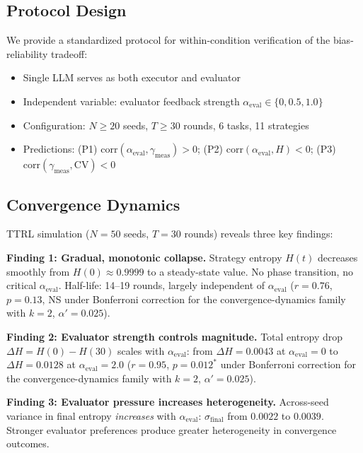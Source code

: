 \documentclass[11pt]{article}
\begin{document}
\subsection{Protocol Design}

We provide a standardized protocol for within-condition verification of the bias-reliability tradeoff:

\begin{itemize}[leftmargin=*,nosep]
 \item Single LLM serves as both executor and evaluator
 \item Independent variable: evaluator feedback strength $\alpha_{\text{eval}} \in \{0, 0.5, 1.0\}$
 \item Configuration: $N \geq 20$ seeds, $T \geq 30$ rounds, 6 tasks, 11 strategies
 \item Predictions: (P1) $\text{corr}(\alpha_{\text{eval}}, \gamma_{\text{meas}}) > 0$; (P2) $\text{corr}(\alpha_{\text{eval}}, H) < 0$; (P3) $\text{corr}(\gamma_{\text{meas}}, \mathrm{CV}) < 0$
\end{itemize}

\subsection{Convergence Dynamics}

TTRL simulation ($N{=}50$ seeds, $T{=}30$ rounds) reveals three key findings:

\textbf{Finding 1: Gradual, monotonic collapse.} Strategy entropy $H(t)$ decreases smoothly from $H(0) \approx 0.9999$ to a steady-state value. No phase transition, no critical $\alpha_{\text{eval}}$. Half-life: 14--19 rounds, largely independent of $\alpha_{\text{eval}}$ ($r = 0.76$, $p = 0.13$, NS under Bonferroni correction for the convergence-dynamics family with $k = 2$, $\alpha' = 0.025$).

\textbf{Finding 2: Evaluator strength controls magnitude.} Total entropy drop $\Delta H = H(0) - H(30)$ scales with $\alpha_{\text{eval}}$: from $\Delta H = 0.0043$ at $\alpha_{\text{eval}} = 0$ to $\Delta H = 0.0128$ at $\alpha_{\text{eval}} = 2.0$ ($r = 0.95$, $p = 0.012^{*}$ under Bonferroni correction for the convergence-dynamics family with $k = 2$, $\alpha' = 0.025$).

\textbf{Finding 3: Evaluator pressure increases heterogeneity.} Across-seed variance in final entropy \emph{increases} with $\alpha_{\text{eval}}$: $\sigma_{\text{final}}$ from $0.0022$ to $0.0039$. Stronger evaluator preferences produce greater heterogeneity in convergence outcomes.
\end{document}
